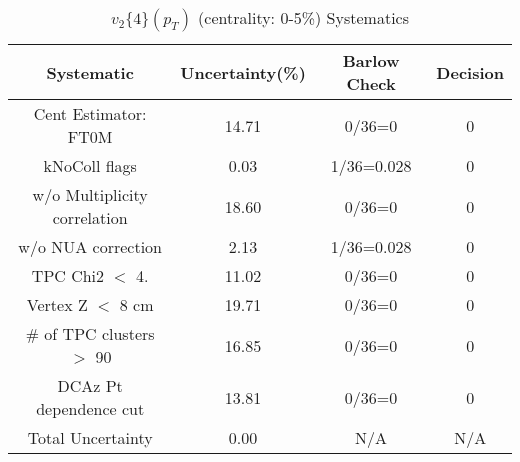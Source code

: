 \begin{table}[htbp]
\caption{$v_2\{4\}(p_{T})$ (centrality: 0-5\%) Systematics}
\label{tab:Sys_pTDiffv24ChFull}
\centering
\begin{tabular}{|c|c|c|c|}
\hline
Systematic & Uncertainty(\%) & Barlow Check & Decision \\
\hline
Cent Estimator: FT0M & 14.71 & 0/36=0 & 0 \\
kNoColl flags & 0.03 & 1/36=0.028 & 0 \\
w/o Multiplicity correlation & 18.60 & 0/36=0 & 0 \\
w/o NUA correction & 2.13 & 1/36=0.028 & 0 \\
TPC Chi2 $<$ 4. & 11.02 & 0/36=0 & 0 \\
Vertex Z $<$ 8 cm & 19.71 & 0/36=0 & 0 \\
\# of TPC clusters $>$ 90 & 16.85 & 0/36=0 & 0 \\
DCAz Pt dependence cut & 13.81 & 0/36=0 & 0 \\
\hline
Total Uncertainty & 0.00 & N/A & N/A \\
\hline
\end{tabular}
\end{table}

